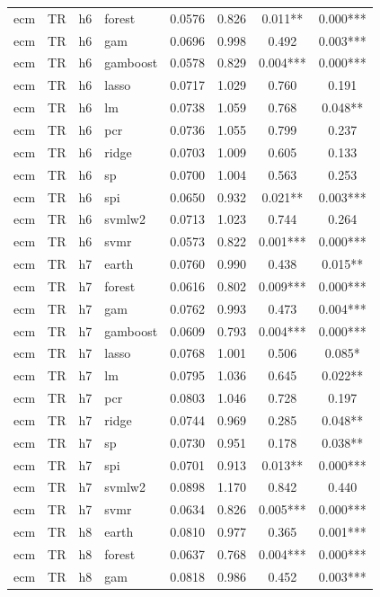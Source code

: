 \begin{ThreePartTable}
\begin{longtable}[t]{llclcccc}
ecm & TR & h6 & forest & 0.0576 & 0.826 & 0.011** & 0.000***\\
ecm & TR & h6 & gam & 0.0696 & 0.998 & 0.492 & 0.003***\\
ecm & TR & h6 & gamboost & 0.0578 & 0.829 & 0.004*** & 0.000***\\
ecm & TR & h6 & lasso & 0.0717 & 1.029 & 0.760 & 0.191\\
ecm & TR & h6 & lm & 0.0738 & 1.059 & 0.768 & 0.048**\\
ecm & TR & h6 & pcr & 0.0736 & 1.055 & 0.799 & 0.237\\
ecm & TR & h6 & ridge & 0.0703 & 1.009 & 0.605 & 0.133\\
ecm & TR & h6 & sp & 0.0700 & 1.004 & 0.563 & 0.253\\
ecm & TR & h6 & spi & 0.0650 & 0.932 & 0.021** & 0.003***\\
ecm & TR & h6 & svmlw2 & 0.0713 & 1.023 & 0.744 & 0.264\\
ecm & TR & h6 & svmr & 0.0573 & 0.822 & 0.001*** & 0.000***\\
\addlinespace
ecm & TR & h7 & earth & 0.0760 & 0.990 & 0.438 & 0.015**\\
ecm & TR & h7 & forest & 0.0616 & 0.802 & 0.009*** & 0.000***\\
ecm & TR & h7 & gam & 0.0762 & 0.993 & 0.473 & 0.004***\\
ecm & TR & h7 & gamboost & 0.0609 & 0.793 & 0.004*** & 0.000***\\
ecm & TR & h7 & lasso & 0.0768 & 1.001 & 0.506 & 0.085*\\
ecm & TR & h7 & lm & 0.0795 & 1.036 & 0.645 & 0.022**\\
ecm & TR & h7 & pcr & 0.0803 & 1.046 & 0.728 & 0.197\\
ecm & TR & h7 & ridge & 0.0744 & 0.969 & 0.285 & 0.048**\\
ecm & TR & h7 & sp & 0.0730 & 0.951 & 0.178 & 0.038**\\
ecm & TR & h7 & spi & 0.0701 & 0.913 & 0.013** & 0.000***\\
ecm & TR & h7 & svmlw2 & 0.0898 & 1.170 & 0.842 & 0.440\\
ecm & TR & h7 & svmr & 0.0634 & 0.826 & 0.005*** & 0.000***\\
\addlinespace
ecm & TR & h8 & earth & 0.0810 & 0.977 & 0.365 & 0.001***\\
ecm & TR & h8 & forest & 0.0637 & 0.768 & 0.004*** & 0.000***\\
ecm & TR & h8 & gam & 0.0818 & 0.986 & 0.452 & 0.003***\\

\end{longtable}
\end{ThreePartTable}
